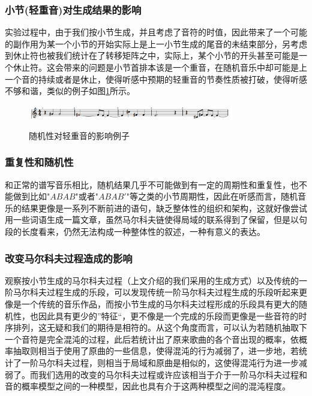 \documentclass[12pt, a4paper, oneside]{ctexart}
\begin{document}
    \subsubsection{小节(轻重音)对生成结果的影响}
    实验过程中，由于我们按小节生成，并且考虑了音符的时值，因此带来了一个可能的副作用为某一个小节的开始实际上是上一小节生成的尾音的未结束部分，另考虑到休止符也被我们统计在了转移矩阵之中，实际上，某个小节的开头甚至可能是一个休止符。这会带来的问题是小节首排本该是一个重音，在随机音乐中却可能是上一个音的持续或者是休止，使得听感中预期的轻重音的节奏性质被打破，使得听感不够和谐，类似的例子如图\ref{fig:1}所示。
    
    \begin{figure}[htbp]
    	\centering
    	\includegraphics[width = 0.8\textwidth]{eg1}
    	\label{fig:1}
    	\caption{随机性对轻重音的影响例子}
    \end{figure}
    
    \subsubsection{重复性和随机性}
    和正常的谱写音乐相比，随机结果几乎不可能做到有一定的周期性和重复性，也不能做到比如"$ABAB$"或者"$ABAB'$"等之类的小节周期性，因此在听感而言，随机音乐的结果更像是一系列不断前进的语句，缺乏整体性的组织和架构，这就好像尝试用一些词语生成一篇文章，虽然马尔科夫链使得局域的联系得到了保留，但是以句段的长度看来，仍然无法构成一种整体性的叙述，一种有意义的表达。
    
    \subsubsection{改变马尔科夫过程造成的影响}
  	观察按小节生成的马尔科夫过程（上文介绍的我们采用的生成方式）以及传统的一阶马尔科夫过程生成的乐段，可以发现传统一阶马尔科夫过程生成的乐段听起来更像是一个传统的音乐作品，而按小节生成的马尔科夫过程形成的乐段具有更大的随机性，也因此具有更少的”特征“，更不像是一个完成的乐段而更像是一些音符的时序排列，这无疑和我们的期待是相符的。从这个角度而言，可以认为若随机抽取下一个音符是完全混沌的过程，此后若统计出了原来歌曲的各个音出现的概率，依概率抽取则相当于使用了原曲的一些信息，使得混沌的行为减弱了，进一步地，若统计了一阶马尔科夫过程，则相当于局域和原曲是相似的，这使得混沌行为进一步减弱了。而我们选用的改变的马尔科夫过程或许应该相当于介于一阶马尔科夫过程和音的概率模型之间的一种模型，因此也具有介于这两种模型之间的混沌程度。
	
\end{document}
